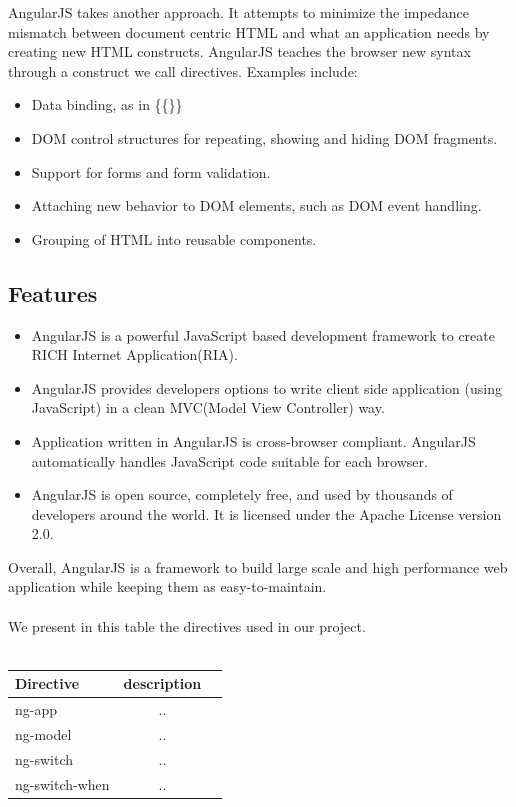 \documentclass[12pt]{article}
\begin{document}
	AngularJS takes another approach. It attempts to minimize the impedance mismatch between document centric HTML and what an application needs by creating new HTML constructs. AngularJS teaches the browser new syntax through a construct we call directives. Examples include:
	\begin{itemize}
		\item Data binding, as in \colorbox{mygray}{\{\{\}\}}
		\item DOM control structures for repeating, showing and hiding DOM fragments.
		\item Support for forms and form validation.
		\item Attaching new behavior to DOM elements, such as DOM event handling.
		\item Grouping of HTML into reusable components.	
	\end{itemize}
	\subsection{Features}
	\begin{itemize}
		\item AngularJS is a powerful JavaScript based development framework to create RICH Internet Application(RIA).
		\item  AngularJS provides developers options to write client side application (using JavaScript) in a clean MVC(Model View Controller) way.
		\item  Application written in AngularJS is cross-browser compliant. AngularJS automatically handles JavaScript code suitable for each browser.
		\item AngularJS is open source, completely free, and used by thousands of developers around the world. It is licensed under the Apache License version 2.0.
	\end{itemize}
		Overall, AngularJS is a framework to build large scale and high performance web application while keeping them as easy-to-maintain.
		\\
		\\
		We present in this table the directives used in our project.
		\\
		\\
		\begin{tabular}{|l|c|r|}
			\hline
			\textbf{Directive} & \textbf{description }\\
			\hline
			ng-app & .. \\
			ng-model & ..  \\
			ng-switch & .. \\
			ng-switch-when & ..  \\	
			\hline
		\end{tabular} 
\end{document}
